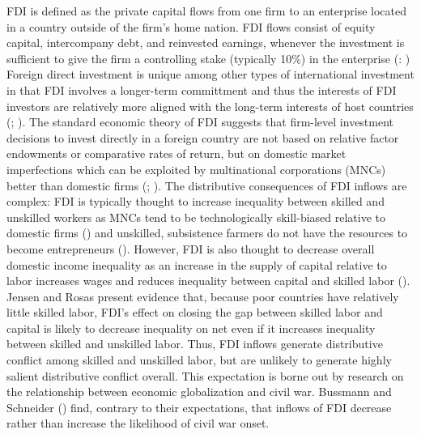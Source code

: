 \documentclass[12pt]{report}
\begin{document}
FDI is defined as the private capital flows from one firm to an enterprise located in a country
outside of the firm's home nation. FDI flows consist of equity capital, intercompany debt, and
reinvested earnings, whenever the investment is sufficient to give the firm a controlling stake
(typically 10\%) in the enterprise (\citealt[9]{DirectInvestmentTechnicalExpertGroupDITEG:2004wa}:
\citealt[588]{Jensen:2003to}) Foreign direct investment is unique among other types of international
investment in that FDI involves a longer-term committment and thus the interests of FDI investors
are relatively more aligned with the long-term interests of host countries (\citealt{Lipsey:1999tn};
\citealt[588]{Jensen:2003to}). The standard economic theory of FDI suggests that firm-level
investment decisions to invest directly in a foreign country are not based on relative factor
endowments or comparative rates of return, but on domestic market imperfections which can be
exploited by multinational corporations (MNCs) better than domestic firms (\citealt{Hymer:1960vo};
\citealt{dunning2013international}). The distributive consequences of FDI inflows are complex: FDI
is typically thought to increase inequality between skilled and unskilled workers as MNCs tend to be
technologically skill-biased relative to domestic firms (\citealt{Feenstra:1997kx}) and unskilled,
subsistence farmers do not have the resources to become entrepreneurs (\citealt{Basu:2007ir}).
However, FDI is also thought to decrease overall domestic income inequality as an increase in the
supply of capital relative to labor increases wages and reduces inequality between capital and
skilled labor (\citealt{Jensen:2007fr}). Jensen and Rosas present evidence that, because poor
countries have relatively little skilled labor, FDI's effect on closing the gap between skilled
labor and capital is likely to decrease inequality on net even if it increases inequality between
skilled and unskilled labor. Thus, FDI inflows generate distributive conflict among skilled and
unskilled labor, but are unlikely to generate highly salient distributive conflict overall. This
expectation is borne out by research on the relationship between economic globalization and civil
war. Bussmann and Schneider (\citeyear{Bussmann:2007vx}) find, contrary to their expectations, that
inflows of FDI decrease rather than increase the likelihood of civil war onset.
\end{document}

